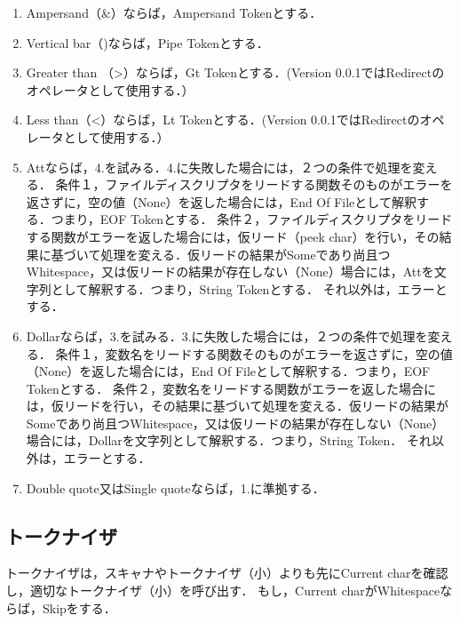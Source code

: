 \documentclass{article}
\begin{document}
\begin{enumerate}
\begin{enumerate}
                \item Ampersand（\&）ならば，Ampersand Tokenとする．
                \item Vertical bar（\textbar)ならば，Pipe Tokenとする．
                \item Greater than （\textgreater）ならば，Gt Tokenとする．(Version 0.0.1ではRedirectのオペレータとして使用する．）
                \item Less than（\textless）ならば，Lt Tokenとする．(Version 0.0.1ではRedirectのオペレータとして使用する．）
                \item Attならば，4.を試みる．4.に失敗した場合には，２つの条件で処理を変える．\newline
                条件１，ファイルディスクリプタをリードする関数そのものがエラーを返さずに，空の値（None）を返した場合には，End Of Fileとして解釈する．つまり，EOF Tokenとする．\newline
                条件２，ファイルディスクリプタをリードする関数がエラーを返した場合には，仮リード（peek char）を行い，その結果に基づいて処理を変える．仮リードの結果がSomeであり尚且つWhitespace，又は仮リードの結果が存在しない（None）場合には，Attを文字列として解釈する．つまり，String Tokenとする．\newline
                それ以外は，エラーとする．
                \item Dollarならば，3.を試みる．3.に失敗した場合には，２つの条件で処理を変える．\newline
                条件１，変数名をリードする関数そのものがエラーを返さずに，空の値（None）を返した場合には，End Of Fileとして解釈する．つまり，EOF Tokenとする．
                条件２，変数名をリードする関数がエラーを返した場合には，仮リードを行い，その結果に基づいて処理を変える．仮リードの結果がSomeであり尚且つWhitespace，又は仮リードの結果が存在しない（None）場合には，Dollarを文字列として解釈する．つまり，String Token．\newline
                それ以外は，エラーとする．
                \item Double quote又はSingle quoteならば，1.に準拠する．
            \end{enumerate}
    \end{enumerate}
\subsection{トークナイザ}
トークナイザは，スキャナやトークナイザ（小）よりも先にCurrent charを確認し，適切なトークナイザ（小）を呼び出す．\newline
もし，Current charがWhitespaceならば，Skipをする．
\end{document}
